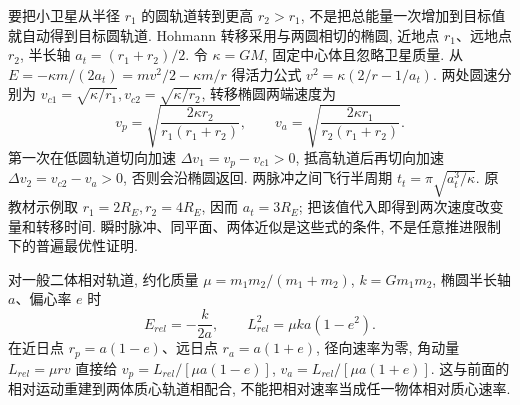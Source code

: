 要把小卫星从半径 $r_1$ 的圆轨道转到更高 $r_2>r_1$, 不是把总能量一次增加到目标值就自动得到目标圆轨道. Hohmann 转移采用与两圆相切的椭圆, 近地点 $r_1$、远地点 $r_2$, 半长轴 $a_t=(r_1+r_2)/2$. 令 $\kappa=GM$, 固定中心体且忽略卫星质量. 从 $E=-\kappa m/(2a_t)=mv^2/2-\kappa m/r$ 得活力公式 $v^2=\kappa(2/r-1/a_t)$. 两处圆速分别为 $v_{c1}=\sqrt{\kappa/r_1},v_{c2}=\sqrt{\kappa/r_2}$, 转移椭圆两端速度为
\[v_p=\sqrt{\frac{2\kappa r_2}{r_1(r_1+r_2)}},\qquad v_a=\sqrt{\frac{2\kappa r_1}{r_2(r_1+r_2)}}.\]
第一次在低圆轨道切向加速 $\Delta v_1=v_p-v_{c1}>0$, 抵高轨道后再切向加速 $\Delta v_2=v_{c2}-v_a>0$, 否则会沿椭圆返回. 两脉冲之间飞行半周期 $t_t=\pi\sqrt{a_t^3/\kappa}$. 原教材示例取 $r_1=2R_E,r_2=4R_E$, 因而 $a_t=3R_E$; 把该值代入即得到两次速度改变量和转移时间. 瞬时脉冲、同平面、两体近似是这些式的条件, 不是任意推进限制下的普遍最优性证明.

对一般二体相对轨道, 约化质量 $\mu=m_1m_2/(m_1+m_2)$, $k=Gm_1m_2$, 椭圆半长轴 $a$、偏心率 $e$ 时
\[E_{rel}=-\frac{k}{2a},\qquad L_{rel}^2=\mu k a(1-e^2).\]
在近日点 $r_p=a(1-e)$、远日点 $r_a=a(1+e)$, 径向速率为零, 角动量 $L_{rel}=\mu r v$ 直接给 $v_p=L_{rel}/[\mu a(1-e)]$, $v_a=L_{rel}/[\mu a(1+e)]$. 这与前面的相对运动重建到两体质心轨道相配合, 不能把相对速率当成任一物体相对质心速率.
